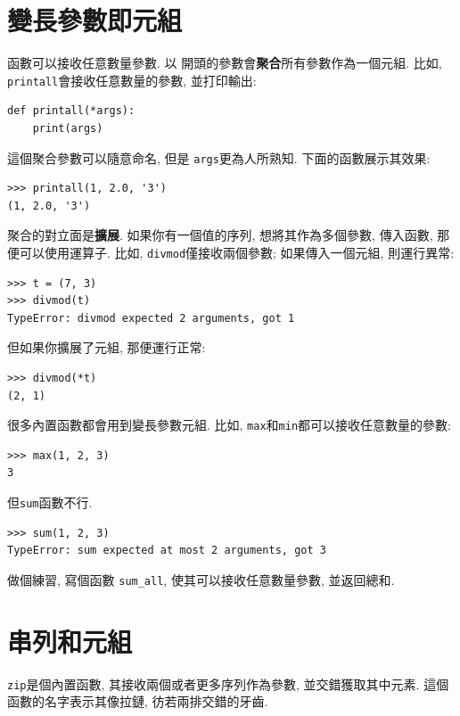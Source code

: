 \documentclass[10pt]{book}
\begin{document}
\section{變長參數即元組}
\label{gather}
函數可以接收任意數量參數. 以{\tt *} 開頭的參數會{\bf 聚合}所有參數作為一個元組. 
比如, {\tt printall}會接收任意數量的參數, 並打印輸出:

\begin{verbatim}
def printall(*args):
    print(args)
\end{verbatim}
%
這個聚合參數可以隨意命名, 但是 {\tt args}更為人所熟知. 
下面的函數展示其效果:

\begin{verbatim}
>>> printall(1, 2.0, '3')
(1, 2.0, '3')
\end{verbatim}
%
聚合的對立面是{\bf 擴展}. 
如果你有一個值的序列, 想將其作為多個參數, 傳入函數, 那便可以使用{\tt *}運算子. 
比如, {\tt divmod}僅接收兩個參數; 如果傳入一個元組, 則運行異常:

\begin{verbatim}
>>> t = (7, 3)
>>> divmod(t)
TypeError: divmod expected 2 arguments, got 1
\end{verbatim}
%
但如果你擴展了元組, 那便運行正常:

\begin{verbatim}
>>> divmod(*t)
(2, 1)
\end{verbatim}
%
很多內置函數都會用到變長參數元組. 
比如, {\tt max}和{\tt min}都可以接收任意數量的參數:

\begin{verbatim}
>>> max(1, 2, 3)
3
\end{verbatim}
%
但{\tt sum}函數不行.

\begin{verbatim}
>>> sum(1, 2, 3)
TypeError: sum expected at most 2 arguments, got 3
\end{verbatim}
%
做個練習, 寫個函數 \verb"sum_all", 使其可以接收任意數量參數, 並返回總和. 


\section{串列和元組}
{\tt zip}是個內置函數,  其接收兩個或者更多序列作為參數, 並交錯獲取其中元素. 
這個函數的名字表示其像拉鏈, 彷若兩排交錯的牙齒. 
\end{document}
